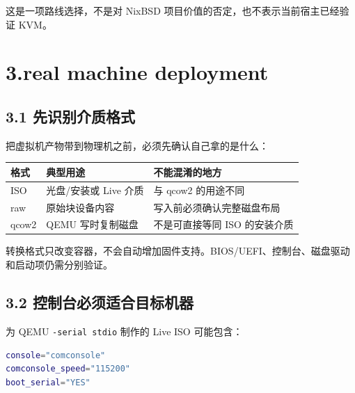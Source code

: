 \documentclass[
  11pt,
  UTF8,
  a4paper,
  fontset=fandol]{ctexart}
\newcommand{\passthrough}[1]{#1}
\begin{document}
这是一项路线选择，不是对 NixBSD 项目价值的否定，也不表示当前宿主已经验证
KVM。

\section{3.real machine deployment}\label{real-machine-deployment}

\subsection{3.1
先识别介质格式}\label{ux5148ux8bc6ux522bux4ecbux8d28ux683cux5f0f}

把虚拟机产物带到物理机之前，必须先确认自己拿的是什么：

\begin{longtable}[]{@{}
  >{\raggedright\arraybackslash}p{}
  >{\raggedright\arraybackslash}p{}
  >{\raggedright\arraybackslash}p{}@{}}
\toprule\noalign{}
\begin{minipage}[b]{\linewidth}\raggedright
格式
\end{minipage} & \begin{minipage}[b]{\linewidth}\raggedright
典型用途
\end{minipage} & \begin{minipage}[b]{\linewidth}\raggedright
不能混淆的地方
\end{minipage} \\
\midrule\noalign{}
\endhead
\bottomrule\noalign{}
\endlastfoot
ISO & 光盘/安装或 Live 介质 & 与 qcow2 的用途不同 \\
raw & 原始块设备内容 & 写入前必须确认完整磁盘布局 \\
qcow2 & QEMU 写时复制磁盘 & 不是可直接等同 ISO 的安装介质 \\
\end{longtable}

转换格式只改变容器，不会自动增加固件支持。BIOS/UEFI、控制台、磁盘驱动和启动项仍需分别验证。

\subsection{3.2
控制台必须适合目标机器}\label{ux63a7ux5236ux53f0ux5fc5ux987bux9002ux5408ux76eeux6807ux673aux5668}

为 QEMU \passthrough{\lstinline!-serial stdio!} 制作的 Live ISO
可能包含：

\begin{lstlisting}[language=sh]
console="comconsole"
comconsole_speed="115200"
boot_serial="YES"
\end{lstlisting}
\end{document}
